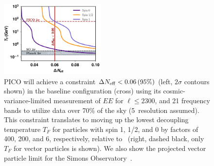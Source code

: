 \documentclass[PICOAPC.tex]{subfiles}
\begin{document}

\begin{figure}[t!]
\begin{center}
\includegraphics[width=0.47\textwidth]{images/Tf_pico.pdf}
\vspace{-0.15in}
\caption{ \captiontext PICO will achieve a constraint $\Delta {N_{\rm eff}} < 0.06\, (95\%)$ (left, $2\sigma$ contours shown) in the baseline configuration (cross) using its cosmic-variance-limited measurement of $EE$ for $\ell \leq 2300$, and 21 frequency bands to utilize data over 70\% of the sky (5\arcmin\ resolution assumed). This constraint translates to moving up the lowest decoupling temperature $T_{F}$ for particles with spin 1, 1/2, and 0 by factors of 400, 200, and 6, respectively, relative to \planck\ (right, dashed black, only $T_{F}$ for vector particles is shown). We also show the projected vector particle limit for the Simons Observatory~\citep{SOscience}. }
\label{fig:Neff_future}  
\end{center}
\vspace{-0.2in}
\end{figure}
\end{document}
